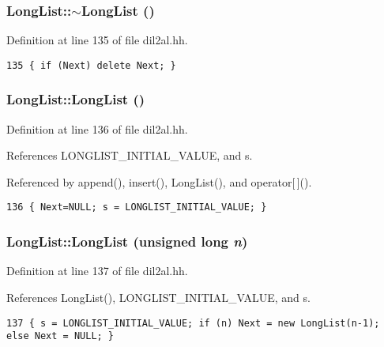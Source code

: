 \subsubsection{\setlength{\rightskip}{0pt plus 5cm}Long\-List::$\sim$Long\-List ()\hspace{0.3cm}{\tt  [inline]}}\label{classLongList_a0}




Definition at line 135 of file dil2al.hh.



\footnotesize\begin{verbatim}135 { if (Next) delete Next; }
\end{verbatim}\normalsize 
{}
\subsubsection{\setlength{\rightskip}{0pt plus 5cm}Long\-List::Long\-List ()\hspace{0.3cm}{\tt  [inline]}}\label{classLongList_a1}




Definition at line 136 of file dil2al.hh.

References LONGLIST\_\-INITIAL\_\-VALUE, and s.

Referenced by append(), insert(), Long\-List(), and operator[$\,$]().



\footnotesize\begin{verbatim}136 { Next=NULL; s = LONGLIST_INITIAL_VALUE; }
\end{verbatim}\normalsize 
{}
\subsubsection{\setlength{\rightskip}{0pt plus 5cm}Long\-List::Long\-List (unsigned long {\em n})\hspace{0.3cm}{\tt  [inline]}}\label{classLongList_a2}




Definition at line 137 of file dil2al.hh.

References Long\-List(), LONGLIST\_\-INITIAL\_\-VALUE, and s.



\footnotesize\begin{verbatim}137 { s = LONGLIST_INITIAL_VALUE; if (n) Next = new LongList(n-1); else Next = NULL; }
\end{verbatim}\normalsize 
{}
